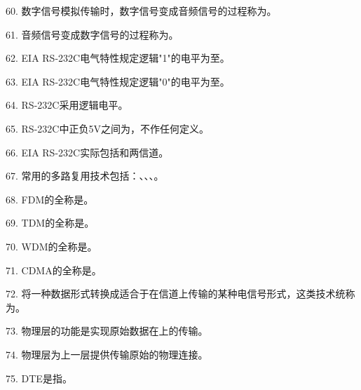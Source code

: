 60. 数字信号模拟传输时，数字信号变成音频信号的过程称为\underline{\hspace{2cm}}。

61. 音频信号变成数字信号的过程称为\underline{\hspace{2cm}}。

62. EIA RS-232C电气特性规定逻辑"1"的电平为\underline{\hspace{2cm}}至\underline{\hspace{2cm}}。

63. EIA RS-232C电气特性规定逻辑"0"的电平为\underline{\hspace{2cm}}至\underline{\hspace{2cm}}。

64. RS-232C采用\underline{\hspace{2cm}}逻辑电平。

65. RS-232C中正负5V之间为\underline{\hspace{2cm}}，不作任何定义。

66. EIA RS-232C实际包括\underline{\hspace{2cm}}和\underline{\hspace{2cm}}两信道。

67. 常用的多路复用技术包括：\underline{\hspace{1.5cm}}、\underline{\hspace{1.5cm}}、\underline{\hspace{1.5cm}}、\underline{\hspace{1.5cm}}。

68. FDM的全称是\underline{\hspace{4cm}}。

69. TDM的全称是\underline{\hspace{4cm}}。

70. WDM的全称是\underline{\hspace{4cm}}。

71. CDMA的全称是\underline{\hspace{4cm}}。

72. 将一种数据形式转换成适合于在信道上传输的某种电信号形式，这类技术统称为\underline{\hspace{2cm}}。

73. 物理层的功能是实现原始数据在\underline{\hspace{2cm}}上的传输。

74. 物理层为上一层提供传输原始\underline{\hspace{2cm}}的物理连接。

75. DTE是指\underline{\hspace{4cm}}。

